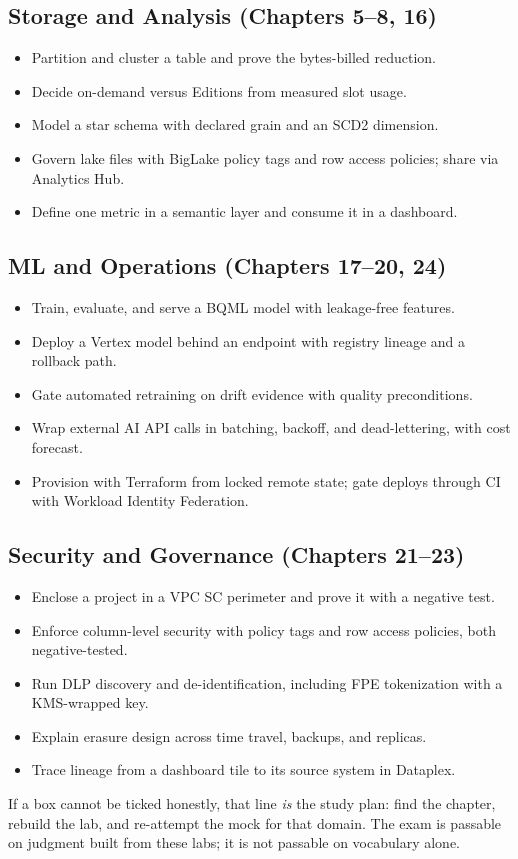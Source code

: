 \subsection*{Storage and Analysis (Chapters 5--8, 16)}
\begin{itemize}
    \item[$\square$] Partition and cluster a table and prove the bytes-billed reduction.
    \item[$\square$] Decide on-demand versus Editions from measured slot usage.
    \item[$\square$] Model a star schema with declared grain and an SCD2 dimension.
    \item[$\square$] Govern lake files with BigLake policy tags and row access policies; share via Analytics Hub.
    \item[$\square$] Define one metric in a semantic layer and consume it in a dashboard.
\end{itemize}

\subsection*{ML and Operations (Chapters 17--20, 24)}
\begin{itemize}
    \item[$\square$] Train, evaluate, and serve a BQML model with leakage-free features.
    \item[$\square$] Deploy a Vertex model behind an endpoint with registry lineage and a rollback path.
    \item[$\square$] Gate automated retraining on drift evidence with quality preconditions.
    \item[$\square$] Wrap external AI API calls in batching, backoff, and dead-lettering, with cost forecast.
    \item[$\square$] Provision with Terraform from locked remote state; gate deploys through CI with Workload Identity Federation.
\end{itemize}

\subsection*{Security and Governance (Chapters 21--23)}
\begin{itemize}
    \item[$\square$] Enclose a project in a VPC SC perimeter and prove it with a negative test.
    \item[$\square$] Enforce column-level security with policy tags and row access policies, both negative-tested.
    \item[$\square$] Run DLP discovery and de-identification, including FPE tokenization with a KMS-wrapped key.
    \item[$\square$] Explain erasure design across time travel, backups, and replicas.
    \item[$\square$] Trace lineage from a dashboard tile to its source system in Dataplex.
\end{itemize}

\begin{tipbox}
If a box cannot be ticked honestly, that line \emph{is} the study plan: find the chapter, rebuild
the lab, and re-attempt the mock for that domain. The exam is passable on judgment built from
these labs; it is not passable on vocabulary alone.
\end{tipbox}
